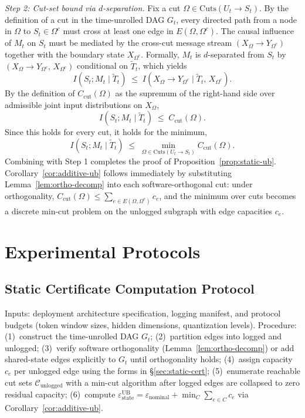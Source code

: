 \documentclass{article}
\begin{document}
\emph{Step 2: Cut-set bound via $d$-separation.} Fix a cut $\Omega \in \mathrm{Cuts}(U_t \to S_t)$. By the definition of a cut in the time-unrolled DAG $G_t$, every directed path from a node in $\Omega$ to $S_t \in \Omega^c$ must cross at least one edge in $E(\Omega, \Omega^c)$. The causal influence of $M_t$ on $S_t$ must be mediated by the cross-cut message stream $(X_\Omega \to Y_{\Omega^c})$ together with the boundary state $X_{\Omega^c}$. Formally, $M_t$ is $d$-separated from $S_t$ by $(X_\Omega \to Y_{\Omega^c},\, X_{\Omega^c})$ conditional on $\tilde T_t$, which yields
\[
  I(S_t; M_t \mid \tilde T_t) \;\leq\; I\!\left(X_\Omega \to Y_{\Omega^c} \;\Big|\; \tilde T_t,\, X_{\Omega^c}\right).
\]
By the definition of $C_\text{cut}(\Omega)$ as the supremum of the right-hand side over admissible joint input distributions on $X_\Omega$,
\[
  I(S_t; M_t \mid \tilde T_t) \;\leq\; C_\text{cut}(\Omega).
\]
Since this holds for every cut, it holds for the minimum,
\[
  I(S_t; M_t \mid \tilde T_t) \;\leq\; \min_{\Omega \in \mathrm{Cuts}(U_t \to S_t)} C_\text{cut}(\Omega).
\]
Combining with Step 1 completes the proof of Proposition~\ref{prop:static-ub}. Corollary~\ref{cor:additive-ub} follows immediately by substituting Lemma~\ref{lem:ortho-decomp} into each software-orthogonal cut: under orthogonality, $C_\text{cut}(\Omega) \leq \sum_{e \in E(\Omega, \Omega^c)} c_e$, and the minimum over cuts becomes a discrete min-cut problem on the unlogged subgraph with edge capacities $c_e$.

\section{Experimental Protocols}
\label{app:methodology}

\subsection{Static Certificate Computation Protocol}

Inputs: deployment architecture specification, logging manifest, and protocol budgets (token window sizes, hidden dimensions, quantization levels). Procedure: (1)~construct the time-unrolled DAG $G_t$; (2)~partition edges into logged and unlogged; (3)~verify software orthogonality (Lemma~\ref{lem:ortho-decomp}) or add shared-state edges explicitly to $G_t$ until orthogonality holds; (4)~assign capacity $c_e$ per unlogged edge using the forms in \S\ref{sec:static-cert}; (5)~enumerate reachable cut sets $\mathcal{C}_\text{unlogged}$ with a min-cut algorithm after logged edges are collapsed to zero residual capacity; (6)~compute $\varepsilon_\text{state}^\text{UB} = \varepsilon_\text{nominal} + \min_C \sum_{e \in C} c_e$ via Corollary~\ref{cor:additive-ub}.
\end{document}
